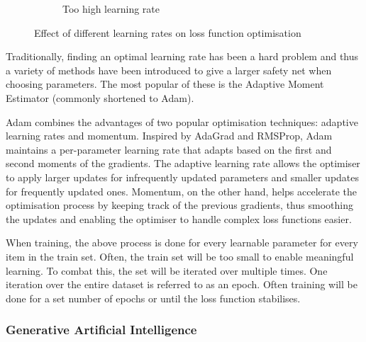 \begin{figure}[H]
\begin{subfigure}{0.3\textwidth}
        \centering
        \caption{Too high learning rate}
    \end{subfigure}
    \caption{Effect of different learning rates on loss function optimisation}
    \label{fig:learning-rates}
\end{figure}

Traditionally, finding an optimal learning rate has been a hard problem and thus a variety of methods have been introduced to give a larger safety net when choosing parameters. The most popular of these is the Adaptive Moment Estimator (commonly shortened to Adam)\cite{kingma2014adam}.

Adam combines the advantages of two popular optimisation techniques: adaptive learning rates and momentum. Inspired by AdaGrad \cite{duchi2011adaptive} and RMSProp, Adam maintains a per-parameter learning rate that adapts based on the first and second moments of the gradients. The adaptive learning rate allows the optimiser to apply larger updates for infrequently updated parameters and smaller updates for frequently updated ones. Momentum, on the other hand, helps accelerate the optimisation process by keeping track of the previous gradients, thus smoothing the updates and enabling the optimiser to handle complex loss functions easier.

When training, the above process is done for every learnable parameter for every item in the train set. Often, the train set will be too small to enable meaningful learning. To combat this, the set will be iterated over multiple times. One iteration over the entire dataset is referred to as an epoch\cite{begmann-backpropagation}. Often training will be done for a set number of epochs or until the loss function stabilises. 

\subsubsection{Generative Artificial Intelligence}

